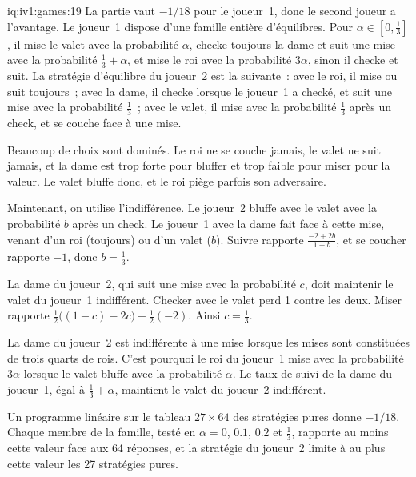 \begin{solution}{iq:iv1:games:19}
La partie vaut $-1/18$ pour le joueur~1, donc le second joueur a l'avantage. Le joueur~1 dispose d'une famille entière d'équilibres. Pour $\alpha \in [0, \tfrac13]$, il mise le valet avec la probabilité $\alpha$, checke toujours la dame et suit une mise avec la probabilité $\tfrac13 + \alpha$, et mise le roi avec la probabilité $3\alpha$, sinon il checke et suit. La stratégie d'équilibre du joueur~2 est la suivante~: avec le roi, il mise ou suit toujours~; avec la dame, il checke lorsque le joueur~1 a checké, et suit une mise avec la probabilité $\tfrac13$~; avec le valet, il mise avec la probabilité $\tfrac13$ après un check, et se couche face à une mise.

Beaucoup de choix sont dominés. Le roi ne se couche jamais, le valet ne suit jamais, et la dame est trop forte pour bluffer et trop faible pour miser pour la valeur. Le valet bluffe donc, et le roi piège parfois son adversaire.

Maintenant, on utilise l'indifférence. Le joueur~2 bluffe avec le valet avec la probabilité $b$ après un check. Le joueur~1 avec la dame fait face à cette mise, venant d'un roi (toujours) ou d'un valet ($b$). Suivre rapporte $\frac{-2 + 2b}{1 + b}$, et se coucher rapporte $-1$, donc $b = \tfrac13$.

La dame du joueur~2, qui suit une mise avec la probabilité $c$, doit maintenir le valet du joueur~1 indifférent. Checker avec le valet perd 1 contre les deux. Miser rapporte $\tfrac12\bigl((1 - c) - 2c\bigr) + \tfrac12(-2)$. Ainsi $c = \tfrac13$.

La dame du joueur~2 est indifférente à une mise lorsque les mises sont constituées de trois quarts de rois. C'est pourquoi le roi du joueur~1 mise avec la probabilité $3\alpha$ lorsque le valet bluffe avec la probabilité $\alpha$. Le taux de suivi de la dame du joueur~1, égal à $\tfrac13 + \alpha$, maintient le valet du joueur~2 indifférent.

Un programme linéaire sur le tableau $27 \times 64$ des stratégies pures donne $-1/18$. Chaque membre de la famille, testé en $\alpha = 0$, $0.1$, $0.2$ et $\tfrac13$, rapporte au moins cette valeur face aux 64 réponses, et la stratégie du joueur~2 limite à au plus cette valeur les 27 stratégies pures.

\end{solution}

